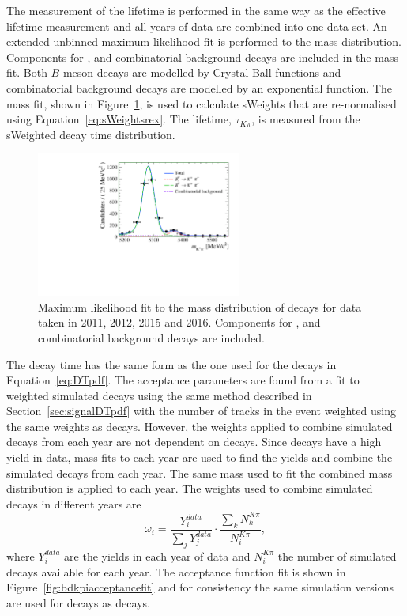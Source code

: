 The measurement of the \bdki lifetime is performed in the same way as the \bsmumu effective lifetime measurement and all years of data are combined into one data set. An extended unbinned maximum likelihood fit is performed to the \bdkpi mass distribution. Components for \bdkpi, \bskpi and combinatorial background decays are included in the mass fit. Both $B$-meson decays are modelled by Crystal Ball functions and combinatorial background decays are modelled by an exponential function. The mass fit, shown in Figure~\ref{fig:bdkpimassfit}, is used to calculate sWeights that are re-normalised using Equation~\ref{eq:sWeightsrex}. The lifetime, $\tau_{K\pi}$, is  measured from the sWeighted decay time distribution. 

\begin{figure}[tbp]
\centering
  \includegraphics[width=0.6\textwidth]{./Figs/LifetimeSystematics/Bd2KPi_mass_fit.pdf}
\caption{Maximum likelihood fit to the mass distribution of \bdkpi decays for data taken in 2011, 2012, 2015 and 2016. Components for \bdkpi, \bskpi and combinatorial background decays are included. }
\label{fig:bdkpimassfit}
\end{figure}


The decay time \pdf has the same form as the one used for the \bsmumu decays in Equation~\ref{eq:DTpdf}. The acceptance parameters are found from a fit to weighted \bdkpi simulated decays using the same method described in Section~\ref{sec:signalDTpdf} with the number of tracks in the event weighted using the same weights as \bsmumu decays. However, the weights applied to combine simulated \bdkpi decays from each year are not dependent on \bsjpsiphi decays. Since \bdkpi decays have a high yield in data, mass fits to each year are used to find the yields and combine the simulated decays from each year. The same mass \pdf used to fit the combined mass distribution is applied to each year. The weights used to combine simulated decays in different years are
\begin{equation}
\omega_{i}  = \frac{Y_{i}^{data}}{\displaystyle\sum_{j} Y_{j}^{data}} \cdot \frac{\displaystyle\sum_{k} N_{k}^{K\pi}}{N_{i}^{K\pi}},
\end{equation}
where $Y_{i}^{data}$ are the \bdkpi yields in each year of data and $N_{i}^{K\pi}$ the number of simulated decays available for each year.
The acceptance function fit is shown in Figure~\ref{fig:bdkpiacceptancefit} and for consistency the same simulation versions are used for \bdkpi decays as \bsmumu decays. 

